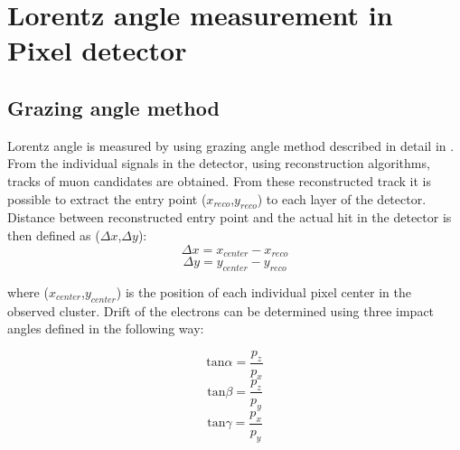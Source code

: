 
\chapter{Lorentz angle measurement in Pixel detector} %

\label{app:LA} %


\section{Grazing angle method}
Lorentz angle is measured by using grazing angle method described in detail in \cite{Henrich}. From the individual signals in the detector, using reconstruction algorithms, tracks of muon candidates are obtained. From these reconstructed track it is possible to extract the entry point ($x_{reco}$,$y_{reco}$) to each layer of the detector. 
Distance between reconstructed entry point and the actual hit in the detector is then defined as ($\Delta x$,$\Delta y$):
\begin{equation}
\Delta x = x_{center}-x_{reco}
\end{equation} 
\begin{equation}
\Delta y = y_{center}-y_{reco}
\end{equation} 

where ($x_{center}$,$y_{center}$) is the position of each individual pixel center in the observed cluster. Drift of the electrons can be determined using three impact angles defined in the following way:

\begin{equation}
\text{tan} \alpha = \frac{p_z}{p_x}
\end{equation}
\begin{equation}
\text{tan} \beta = \frac{p_z}{p_y}
\end{equation}
\begin{equation}
\text{tan} \gamma = \frac{p_x}{p_y}
\end{equation}

